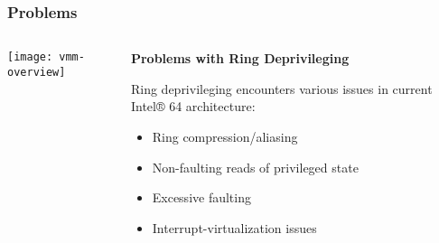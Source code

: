 \begin{frame}[plain]
	\frametitle{Problems }
	
	
	
	\begin{columns}
		
		\begin{column}{.3\textwidth}
			
			\texttt{[image: vmm-overview]}
			
		\end{column}
		
		\begin{column}{.7\textwidth}
			
			\textbf{Problems with Ring Deprivileging}
			
			Ring deprivileging encounters various issues in current Intel® 64 architecture:
			\begin{itemize}
				\item Ring compression/aliasing
				\item Non-faulting reads of privileged state
				\item Excessive faulting
				\item Interrupt-virtualization issues
				
			\end{itemize} 
			
		\end{column}
		
		
	\end{columns}
	
	
\end{frame}


